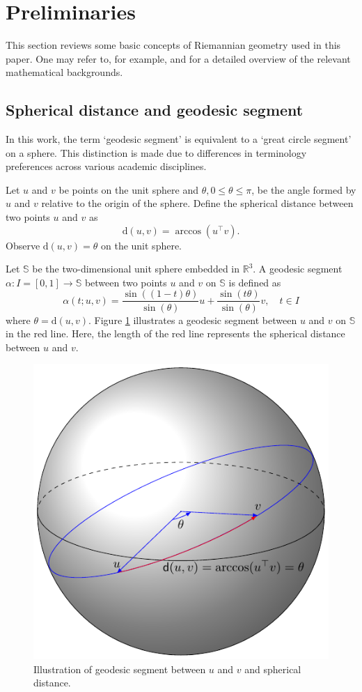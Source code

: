 \section{Preliminaries}\label{prelim}

This section reviews some basic concepts of Riemannian geometry used in this paper. One may refer to, for example, \citet{carmo1976differential} and \citet{carmo1992riemannian} for a detailed overview of the relevant mathematical backgrounds.

\subsection*{Spherical distance and geodesic segment}\label{spherical-distance-and-geodesic-segment}

In this work, the term `geodesic segment' is equivalent to a `great circle segment' on a sphere. This distinction is made due to differences in terminology preferences across various academic disciplines.

Let \(u\) and \(v\) be points on the unit sphere and \(\theta, 0\leq\theta\leq\pi\), be the angle formed by \(u\) and \(v\) relative to the origin of the sphere. Define the spherical distance between two points \(u\) and \(v\) as
\[\text{d}(u, v) = \arccos(u^{\top}v).\]
Observe \(\text{d}(u, v) = \theta\) on the unit sphere.

Let \(\mathbb{S}\) be the two-dimensional unit sphere embedded in \(\mathbb{R}^3\).
A geodesic segment \(\alpha: I = [0, 1] \rightarrow \mathbb{S}\) between two points \(u\) and \(v\) on \(\mathbb{S}\) is defined as
\[
\alpha(t; u, v) =
\frac{\sin((1-t)\theta)}{\sin(\theta)}u
 + \frac{\sin(t \theta)}{\sin(\theta)}v,\quad t \in I
\]
where \(\theta = \text{d}(u, v)\). Figure \ref{fig:dist-geodesic} illustrates a geodesic segment between \(u\) and \(v\) on \(\mathbb{S}\) in the red line. Here, the length of the red line represents the spherical distance between \(u\) and \(v\).

\begin{figure}

{\centering \includegraphics[width=0.4\linewidth]{figures/geodesic_dist} 

}

\caption{Illustration of geodesic segment between $u$ and $v$ and spherical distance.}\label{fig:dist-geodesic}
\end{figure}

